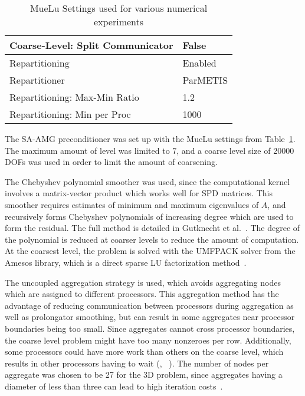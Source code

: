 \begin{table}[ht]
\begin{tabular}{|l|l|}
    Coarse-Level: Split Communicator     & False                 \\ 
    \hline
    Repartitioning                      & Enabled               \\
    Repartitioner                       & ParMETIS              \\
    Repartitioning: Max-Min Ratio       & 1.2                   \\
    Repartitioning: Min per Proc        & 1000                  \\
    \hline
    \end{tabular}
    \caption{MueLu Settings used for various numerical experiments}
    \label{table:muelu}
\end{table}

The SA-AMG preconditioner was set up with the MueLu settings from Table~\ref{table:muelu}. The maximum amount of level was limited to 7, and a coarse level size of 20000 DOFs was used in order to limit the amount of coarsening.

The Chebyshev polynomial smoother was used, since the computational kernel involves a matrix-vector product which works well for SPD matrices. This smoother requires estimates of minimum and maximum eigenvalues of $A$, and recursively forms Chebyshev polynomials of increasing degree which are used to form the residual. The full method is detailed in Gutknecht et al.~\cite{Gutknecht2002}. The degree of the polynomial is reduced at coarser levels to reduce the amount of computation. At the coarsest level, the problem is solved with the UMFPACK solver from the Amesos library, which is a direct sparse LU factorization method~\cite{Davis2004}.

The uncoupled aggregation strategy is used, which avoids aggregating nodes which are assigned to different processors. This aggregation method has the advantage of reducing communication between processors during aggregation as well as prolongator smoothing, but can result in some aggregates near processor boundaries being too small. Since aggregates cannot cross processor boundaries, the coarse level problem might have too many nonzeroes per row. Additionally, some processors could have more work than others on the coarse level, which results in other processors having to wait (\cite{Tuminaro2000}, ~\cite{Hu2014}). The number of nodes per aggregate was chosen to be 27 for the 3D problem, since aggregates having a diameter of less than three can lead to high iteration costs~\cite{Tuminaro2000}.


